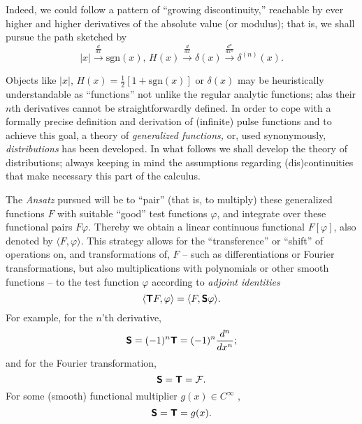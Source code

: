 
Indeed, we could follow a pattern of ``growing discontinuity,''
reachable by ever higher and higher derivatives of the
absolute value (or modulus); that is, we shall pursue the path sketched by
$$
\vert x\vert
\stackrel{\frac{d}{dx}  }{  \longrightarrow}
\textrm{sgn}(x) ,\,
H(x)
\stackrel{\frac{d}{dx} }{ \longrightarrow}
\delta (x)
\stackrel{\frac{d^n}{dx^n} }{ \longrightarrow}
\delta^{(n)} (x)
.
$$



Objects like $\vert x\vert$,  $H(x)=\frac{1}{2}\left[ 1+\textrm{sgn}(x)\right]$ or $\delta (x)$ may be heuristically understandable
as ``functions'' not unlike
the regular analytic functions; alas
their $n$th derivatives cannot be straightforwardly defined.
In order to cope with a formally precise definition
and derivation of (infinite) pulse functions and to achieve this goal,
a theory of  {\em  generalized functions,}
or, used synonymously,
{\em distributions}
has been developed.
In what follows we shall
develop the theory of distributions;
always keeping in mind the assumptions
regarding (dis)continuities
that make necessary this part of the calculus.

The {\it Ansatz} pursued\cite{richards_youn_1990}
will be to ``pair'' (that is, to multiply) these generalized functions $F$ with suitable ``good''
test functions $\varphi$,
and integrate over these functional pairs $F \varphi$.
Thereby we obtain a linear continuous functional
$F[\varphi]$,
also denoted by
$\langle F, \varphi \rangle $.
This strategy allows for the
``transference'' or ``shift'' of operations on, and transformations of, $F$
-- such as differentiations or Fourier transformations, but also multiplications with polynomials or other smooth functions --
to the test function $\varphi$ according to
{\em adjoint identities}
\begin{equation}
\langle \textsf{\textbf{T}} F, \varphi \rangle
=
\langle F, \textsf{\textbf{S}} \varphi \rangle.
\end{equation}
For example,
for the $n$'th derivative,
\begin{equation}
\textsf{\textbf{S}} = (-1)^n \textsf{\textbf{T}} = (-1)^n \frac{d^{n}}{dx^{n}};
\end{equation}
and for the Fourier transformation,
\begin{equation}
\textsf{\textbf{S}} =   \textsf{\textbf{T}} = {\cal F} .
\end{equation}
For some (smooth) functional multiplier $g(x)\in C^\infty$ ,
\begin{equation}
\textsf{\textbf{S}} =   \textsf{\textbf{T}} = g(x) .
\label{2013-m-ch-di-multipl}
\end{equation}



